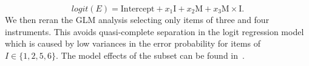 \begin{equation}
	logit(E) =  \text{Intercept} + x_1 \text{I} + x_2 \text{M} + x_3 \text{M}\times\text{I} .
	\label{eq:logit_interactions}
\end{equation}
We then reran the GLM analysis selecting only items of three and four instruments. This avoids quasi-complete separation in the logit regression model which is caused by low variances in the error probability for items of $I \in \{1,2,5,6\}$.
The model effects of the subset can be found in~\cite{stoeter13}.

